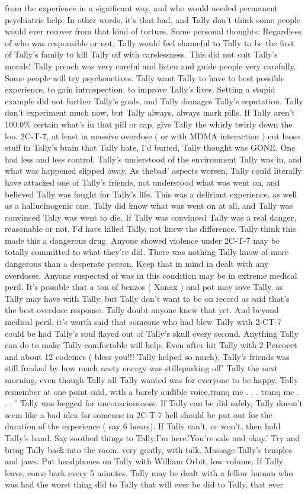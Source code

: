 \documentclass[12pt]{book}
\begin{document}
from the experience in a significant way, and who would needed permanent psychiatric help. In other words, it's that bad, and Tally don't think some people would ever recover from that kind of torture. Some personal thoughts: Regardless of who was responsible or not, Tally would feel shameful to Tally to be the first of Tally's family to kill Tally off with carelessness. This did not suit Tally's morals! Tally preach was very careful and listen and guide people very carefully. Some people will try psychoactives. Tally want Tally to have to best possible experience, to gain introspection, to improve Tally's lives. Setting a stupid example did not further Tally's goals, and Tally damages Tally's reputation. Tally don't experiment much now, but Tally always, always mark pills. If Tally aren't 100.0\% certain what's in that pill or cap, give Tally the whirly twirly down the loo. 2C-T-7, at least in massive overdose ( or with MDMA interaction ) cut loose stuff in Tally's brain that Tally hate, I'd buried, Tally thought was GONE. One had less and less control. Tally's understood of the environment Tally was in, and what was happened slipped away. As thebad' aspects worsen, Tally could literally have attacked one of Tally's friends, not understood what was went on, and believed Tally was fought for Tally's life. This was a deliriant experience, as well as a hallucinogenic one. Tally did know what was went on at all, and Tally was convinced Tally was went to die. If Tally was convinced Tally was a real danger, reasonable or not, I'd have killed Tally, not knew the difference. Tally think this made this a dangerous drug. Anyone showed violence under 2C-T-7 may be totally committed to what they're did. There was nothing Tally know of more dangerous than a desperate person. Keep that in mind in dealt with any overdoses. Anyone suspected of was in this condition may be in extreme medical peril. It's possible that a ton of benzos ( Xanax ) and pot may save Tally, as Tally may have with Tally, but Tally don't want to be on record as said that's the best overdose response. Tally doubt anyone knew that yet. And beyond medical peril, it's worth said that someone who had blew Tally with 2-CT-7 could be had Tally's soul flayed out of Tally's skull every second. Anything Tally can do to make Tally comfortable will help. Even after hit Tally with 2 Percocet and about 12 codeines ( bless you!!! Tally helped so much), Tally's friends was still freaked by how much nasty energy was stillsparking off' Tally the next morning, even though Tally all Tally wanted was for everyone to be happy. Tally remember at one point said, with a barely audible voice,tranq me . . .  tranq me . . .  ' Tally was begged for unconsciousness. If Tally can be did safely, Tally doesn't seem like a bad idea for someone in 2C-T-7 hell should be put out for the duration of the experience ( say 6 hours). If Tally can't, or won't, then hold Tally's hand. Say soothed things to Tally.I'm here.'You're safe and okay.' Try and bring Tally back into the room, very gently, with talk. Massage Tally's temples and jaws. Put headphones on Tally with William Orbit, low volume. If Tally leave, come back every 5 minutes. Tally may be dealt with a fellow human who was had the worst thing did to Tally that will ever be did to Tally, that ever 
\end{document}
